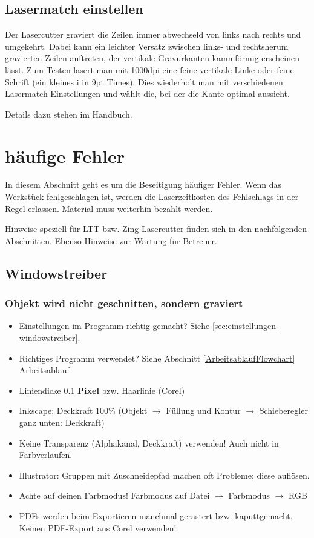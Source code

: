 \documentclass{\basedir/fablab-document}
\begin{document}
	\subsection{Lasermatch einstellen}
	Der Lasercutter graviert die Zeilen immer abwechseld von links nach rechts und umgekehrt. Dabei kann ein leichter Versatz zwischen links- und rechtsherum gravierten Zeilen auftreten, der vertikale Gravurkanten kammförmig erscheinen lässt. Zum Testen lasert man mit 1000dpi eine feine vertikale Linke oder feine Schrift (ein kleines i in 9pt Times). Dies wiederholt man mit verschiedenen Lasermatch-Einstellungen und wählt die, bei der die Kante optimal aussieht.
	
	Details dazu stehen im Handbuch.
	
	\section{häufige Fehler}
	\label{sec:fehler-allgemein}
	In diesem Abschnitt geht es um die Beseitigung häufiger Fehler. Wenn das Werkstück fehlgeschlagen ist, werden die Laserzeitkosten des Fehlschlags in der Regel erlassen. Material muss weiterhin bezahlt werden.
	
	Hinweise speziell für LTT bzw. Zing Lasercutter finden sich in den nachfolgenden Abschnitten. Ebenso Hinweise zur Wartung für Betreuer.
	
	\subsection{Windowstreiber}
	\subsubsection{Objekt wird nicht geschnitten, sondern graviert}
	\begin{itemize}
		\item Einstellungen im Programm richtig gemacht? Siehe \cref{sec:einstellungen-windowstreiber}.
		\item Richtiges Programm verwendet? Siehe Abschnitt \ref{ArbeitsablaufFlowchart} Arbeitsablauf
		\item Liniendicke 0.1 \textbf{Pixel} bzw. Haarlinie (Corel)
		\item Inkscape: Deckkraft 100\% (Objekt $\rightarrow$ Füllung und Kontur $\rightarrow$ Schieberegler ganz unten: Deckkraft)
		\item Keine Transparenz (Alphakanal, Deckkraft) verwenden! Auch nicht in Farbverläufen.
		\item Illustrator: Gruppen mit Zuschneidepfad machen oft Probleme; diese auflösen.
		\item Achte auf deinen Farbmodus! Farbmodus auf Datei $\rightarrow$ Farbmodus $\rightarrow$ RGB
		\item PDFs werden beim Exportieren manchmal gerastert bzw. kaputtgemacht. Keinen PDF-Export aus Corel verwenden!
	\end{itemize}
	
\end{document}
